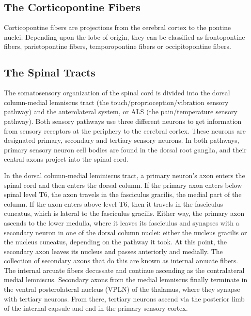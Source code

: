 \hypertarget{the-corticopontine-fibers}{%
\subsection{The Corticopontine Fibers}\label{the-corticopontine-fibers}}

Corticopontine fibers are projections from the cerebral cortex to the pontine nuclei. Depending upon the lobe of origin, they can be classified as frontopontine fibers, parietopontine fibers, temporopontine fibers or occipitopontine fibers.

\hypertarget{the-spinal-tracts}{%
\subsection{The Spinal Tracts}\label{the-spinal-tracts}}

The somatosensory organization of the spinal cord is divided into the dorsal column-medial lemniscus tract (the touch/proprioception/vibration sensory pathway) and the anterolateral system, or ALS (the pain/temperature sensory pathway). Both sensory pathways use three different neurons to get information from sensory receptors at the periphery to the cerebral cortex. These neurons are designated primary, secondary and tertiary sensory neurons. In both pathways, primary sensory neuron cell bodies are found in the dorsal root ganglia, and their central axons project into the spinal cord.

In the dorsal column-medial leminiscus tract, a primary neuron's axon enters the spinal cord and then enters the dorsal column. If the primary axon enters below spinal level T6, the axon travels in the fasciculus gracilis, the medial part of the column. If the axon enters above level T6, then it travels in the fasciculus cuneatus, which is lateral to the fasciculus gracilis. Either way, the primary axon ascends to the lower medulla, where it leaves its fasciculus and synapses with a secondary neuron in one of the dorsal column nuclei: either the nucleus gracilis or the nucleus cuneatus, depending on the pathway it took. At this point, the secondary axon leaves its nucleus and passes anteriorly and medially. The collection of secondary axons that do this are known as internal arcuate fibers. The internal arcuate fibers decussate and continue ascending as the contralateral medial lemniscus. Secondary axons from the medial lemniscus finally terminate in the ventral posterolateral nucleus (VPLN) of the thalamus, where they synapse with tertiary neurons. From there, tertiary neurons ascend via the posterior limb of the internal capsule and end in the primary sensory cortex.

